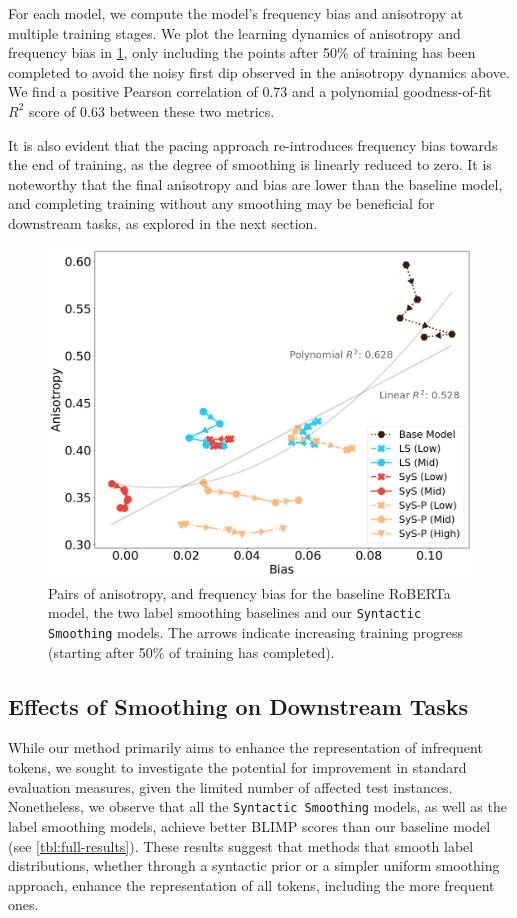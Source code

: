 For each model, we compute the model's frequency bias and anisotropy at multiple training stages. We plot the learning dynamics of anisotropy and frequency bias in \cref{fig:bias-anisotropy-correlation}, only including the points after 50\% of training has been completed to avoid the noisy first dip observed in the anisotropy dynamics above. We find a positive Pearson correlation of 0.73 and a polynomial goodness-of-fit $R^2$ score of 0.63 between these two metrics.

It is also evident that the pacing approach re-introduces frequency bias towards the end of training, as the degree of smoothing is linearly reduced to zero. It is noteworthy that the final anisotropy and bias are lower than the baseline model, and completing training without any smoothing may be beneficial for downstream tasks, as explored in the next section.

\begin{figure}[ht!]
    \centering
    \includegraphics[width=\linewidth]{chapters/syntatic-smoothing/figures/bias-vs-anisotropy.png}
    \caption{Pairs of anisotropy, and frequency bias for the baseline RoBERTa model, the two label smoothing baselines and our \texttt{Syntactic Smoothing} models. The arrows indicate increasing training progress (starting after 50\% of training has completed).}
    \label{fig:bias-anisotropy-correlation}
\end{figure}

\subsection{Effects of Smoothing on Downstream Tasks}
While our method primarily aims to enhance the representation of infrequent tokens, we sought to investigate the potential for improvement in standard evaluation measures, given the limited number of affected test instances. Nonetheless, we observe that all the \texttt{Syntactic Smoothing} models, as well as the label smoothing models, achieve better BLIMP scores than our baseline model (see \cref{tbl:full-results}). These results suggest that methods that smooth label distributions, whether through a syntactic prior or a simpler uniform smoothing approach, enhance the representation of all tokens, including the more frequent ones.

